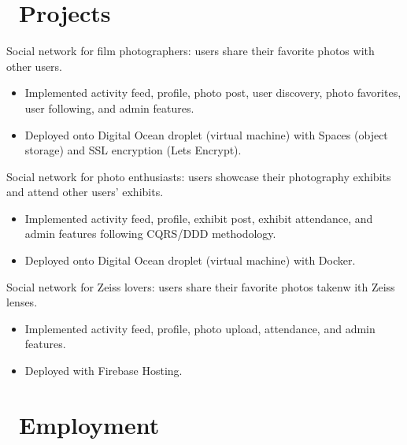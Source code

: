 \documentclass{resume}
\begin{document}



\section{\faUsers\ Projects}
Social network for film photographers: users share their favorite photos with
other users.
\begin{itemize}
  \item Implemented activity feed, profile, photo post, user discovery, photo
          favorites, user following, and
          admin features.
  \item Deployed onto Digital Ocean droplet (virtual machine) with Spaces
          (object storage) and SSL encryption (Lets Encrypt). 
\end{itemize}

Social network for photo enthusiasts: users showcase their photography exhibits
and attend other users' exhibits.
\begin{itemize}
  \item Implemented activity feed, profile, exhibit post, exhibit attendance, and admin
          features following CQRS/DDD methodology.
  \item Deployed onto Digital Ocean droplet (virtual machine) with Docker.
\end{itemize}

Social network for Zeiss lovers: users share their favorite photos takenw ith
Zeiss lenses.
\begin{itemize}
  \item Implemented activity feed, profile, photo upload, attendance, and admin
          features.
  \item Deployed with Firebase Hosting.
\end{itemize}


\section{\faUsers\ Employment}
\end{document}
